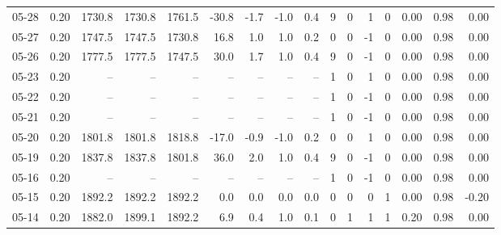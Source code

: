 \begin{threeparttable}
{\begin{tabular}{lrrrrrrrrrrrrrrr}
  05-28 &     0.20 & 1730.8 & 1730.8 & 1761.5 &      -30.8 &           -1.7 &                     -1.0 &                 0.4 &              9 &         0 &     1 &         0 &       0.00 &      0.98 &           0.00 \\
  05-27 &     0.20 & 1747.5 & 1747.5 & 1730.8 &       16.8 &            1.0 &                      1.0 &                 0.2 &              0 &         0 &    -1 &         0 &       0.00 &      0.98 &           0.00 \\
  05-26 &     0.20 & 1777.5 & 1777.5 & 1747.5 &       30.0 &            1.7 &                      1.0 &                 0.4 &              9 &         0 &    -1 &         0 &       0.00 &      0.98 &           0.00 \\
  05-23 &     0.20 &     -- &     -- &     -- &         -- &             -- &                       -- &                  -- &              1 &         0 &     1 &         0 &       0.00 &      0.98 &           0.00 \\
  05-22 &     0.20 &     -- &     -- &     -- &         -- &             -- &                       -- &                  -- &              1 &         0 &    -1 &         0 &       0.00 &      0.98 &           0.00 \\
  05-21 &     0.20 &     -- &     -- &     -- &         -- &             -- &                       -- &                  -- &              1 &         0 &    -1 &         0 &       0.00 &      0.98 &           0.00 \\
  05-20 &     0.20 & 1801.8 & 1801.8 & 1818.8 &      -17.0 &           -0.9 &                     -1.0 &                 0.2 &              0 &         0 &     1 &         0 &       0.00 &      0.98 &           0.00 \\
  05-19 &     0.20 & 1837.8 & 1837.8 & 1801.8 &       36.0 &            2.0 &                      1.0 &                 0.4 &              9 &         0 &    -1 &         0 &       0.00 &      0.98 &           0.00 \\
  05-16 &     0.20 &     -- &     -- &     -- &         -- &             -- &                       -- &                  -- &              1 &         0 &    -1 &         0 &       0.00 &      0.98 &           0.00 \\
  05-15 &     0.20 & 1892.2 & 1892.2 & 1892.2 &        0.0 &            0.0 &                      0.0 &                 0.0 &              0 &         0 &     0 &         1 &       0.00 &      0.98 &          -0.20 \\
  05-14 &     0.20 & 1882.0 & 1899.1 & 1892.2 &        6.9 &            0.4 &                      1.0 &                 0.1 &              0 &         1 &     1 &         1 &       0.20 &      0.98 &           0.00 \\

\end{tabular}}
\end{threeparttable}
